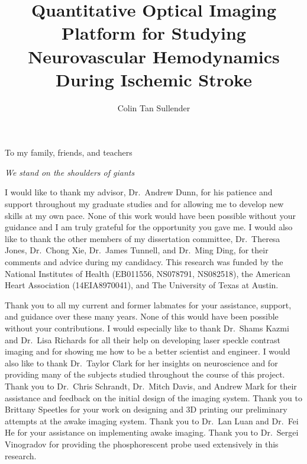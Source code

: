 \documentclass[12pt]{report}
\author{Colin Tan Sullender}
\title{Quantitative Optical Imaging Platform for Studying Neurovascular Hemodynamics During Ischemic Stroke}
\begin{document}
\copyrightpage      %
\commcertpage       %
\titlepage          %


\begin{dedication}
To my family, friends, and teachers

\textit{We stand on the shoulders of giants}
\end{dedication}


\begin{acknowledgments}
I would like to thank my advisor, Dr.\ Andrew Dunn, for his patience and support throughout my graduate studies and for allowing me to develop new skills at my own pace. None of this work would have been possible without your guidance and I am truly grateful for the opportunity you gave me. I would also like to thank the other members of my dissertation committee, Dr.\ Theresa Jones, Dr.\ Chong Xie, Dr.\ James Tunnell, and Dr.\ Ming Ding, for their comments and advice during my candidacy. This research was funded by the National Institutes of Health (EB011556, NS078791, NS082518), the American Heart Association (14EIA8970041), and The University of Texas at Austin.

Thank you to all my current and former labmates for your assistance, support, and guidance over these many years. None of this would have been possible without your contributions. I would especially like to thank Dr.\ Shams Kazmi and Dr.\ Lisa Richards for all their help on developing laser speckle contrast imaging and for showing me how to be a better scientist and engineer. I would also like to thank Dr.\ Taylor Clark for her insights on neuroscience and for providing many of the subjects studied throughout the course of this project. Thank you to Dr.\ Chris Schrandt, Dr.\ Mitch Davis, and Andrew Mark for their assistance and feedback on the initial design of the imaging system. Thank you to Brittany Speetles for your work on designing and 3D printing our preliminary attempts at the awake imaging system. Thank you to Dr.\ Lan Luan and Dr.\ Fei He for your assistance on implementing awake imaging. Thank you to Dr.\ Sergei Vinogradov for providing the phosphorescent probe used extensively in this research.


\end{acknowledgments}
\end{document}
